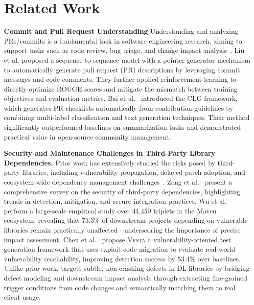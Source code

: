\section{Related Work}
\label{related_work}
\textbf{Commit and Pull Request Understanding}
Understanding and analyzing PRs/commits is a fundamental task in software engineering research, aiming to support tasks such as code review, bug triage, and change impact analysis~\cite{icsik2025enhancing,chen2022untangling,li2022utango,dias2015untangling,muylaert2018untangling,herbold2022fine,liu2019automatic,xiao2024generative,bai2025clg,meng2024keytitle,meijer2024ecosystem,venigalla2024exploratory,pan2022automated}.
Liu et al.\cite{liu2019automatic} proposed a sequence-to-sequence model with a pointer-generator mechanism to automatically generate pull request (PR) descriptions by leveraging commit messages and code comments. 
They further applied reinforcement learning to directly optimize ROUGE scores and mitigate the mismatch between training objectives and evaluation metrics.
Bai et al.~\cite{bai2025clg} introduced the CLG framework, which generates PR checklists automatically from contribution guidelines by combining multi-label classification and text generation techniques. 
Their method significantly outperformed baselines on summarization tasks and demonstrated practical value in open-source community management.


\textbf{Security and Maintenance Challenges in Third-Party Library Dependencies.}
Prior work has extensively studied the risks posed by third-party libraries, including vulnerability propagation, delayed patch adoption, and ecosystem-wide dependency management challenges~\cite{zimmermann2019small,duan2020towards, huang2022characterizing,decan2019empirical,alfadel2023empirical,liu2022demystifying,chen2023identifying,zhang2023compatible,williams2025research,zhao2023software,zhang2023mitigating,zhang2024does,zhang2024vulnerability,gao2025vulnerability,zhou2024magneto,chen2025diffploitfacilitatingcrossversionexploit,liu2025empirical}. 
Zeng et al.~\cite{zeng2024survey} present a comprehensive survey on the security of third-party dependencies, highlighting trends in detection, mitigation, and secure integration practices.
Wu et al.~\cite{wu2023understanding} perform a large-scale empirical study over 44,450 triplets in the Maven ecosystem, revealing that 73.3\% of downstream projects depending on vulnerable libraries remain practically unaffected—underscoring the importance of precise impact assessment.
Chen et al.~\cite{chen2024exploiting} propose \textsc{Vesta} a vulnerability-oriented test generation framework that uses exploit code migration to evaluate real-world vulnerability reachability, improving detection success by 53.4\% over baselines.
Unlike prior work, \appname targets subtle, non-crashing defects in DL libraries by bridging defect modeling and downstream impact analysis through extracting fine-grained trigger conditions from code changes and semantically matching them to real client usage.
